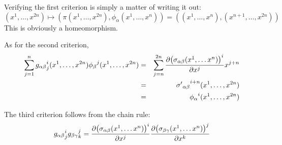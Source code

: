 \documentclass[12pt]{article}
\begin{document}
Verifying the first criterion is simply a matter of writing it out:
 $$(x^1, \ldots, x^{2n}) \mapsto ( \pi (x^1, \ldots, x^{2n}), \phi_\alpha (x^1, \ldots, x^{n})) = ( (x^1, \ldots, x^n), (x^{n+1}, \ldots, x^{2n}) )$$
This is obviously a homeomorphism.

As for the second criterion,
\begin{eqnarray*}
\sum_{j = 1}^n {g_{\alpha \beta}}^i_j (x^1, \ldots, x^{2n}) {\phi_\beta}^j (x^1, \ldots, x^{2n}) &=& \sum_{j = n}^{2n} {\partial \big( \sigma_{\alpha \beta} (x^1, \ldots x^n) \big)^i \over \partial x^j} x^{j+n} \\ &=& {{\sigma'}_{\alpha \beta}}^{i+n} (x^1, \ldots, x^{2n}) \\ &=& {\phi_\alpha}^i (x^1, \ldots, x^{2n})
\end{eqnarray*}

The third criterion follows from the chain rule:
\begin{eqnarray*}
{g_{\alpha \beta}}^i_j  {g_{\beta \gamma}}^j_k = {\partial \big( \sigma_{\alpha \beta} (x^1, \ldots x^n) \big)^i \over \partial x^j} {\partial \big( \sigma_{\beta \gamma} (x^1, \ldots x^n) \big)^j \over \partial x^k}
\end{eqnarray*}
\end{document}
